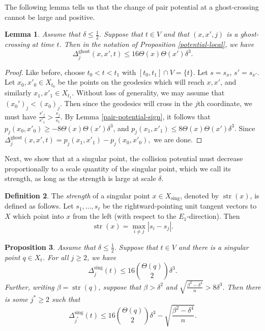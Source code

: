 \documentclass[11pt,reqno,twoside]{amsart}
\newcommand{\sing}{\mathrm{sing}}
\DeclareMathOperator{\strength}{\mathrm{str}}
\newtheorem{lemma}{Lemma}
\newtheorem{proposition}[lemma]{Proposition}
\theoremstyle{definition}
\newtheorem{definition}[lemma]{Definition}
\begin{document}
    The following lemma tells us that the change of pair potential at a ghost-crossing cannot be large and positive.

    \begin{lemma} \label{ghost-crossing-potential}
    Assume that $\delta \leq \frac{1}{2}$.
        Suppose that $t \in V$ and that $(x,x',j)$ is a ghost-crossing at time $t$. Then in the notation of Proposition \ref{potential-local}, we have
        \[\Delta_j^{\mathrm{ghost}}(x,x',t) \leq 16 \Theta(x) \Theta(x') \delta^3.\]
    \end{lemma}

    \begin{proof}
        Like before, choose $t_0 < t < t_1$ with $[t_0,t_1] \cap V = \{t\}.$ Let $s = s_x$, $s' = s_{x'}$. Let $x_0,x'_0 \in X_{t_0}$ be the points on the geodesics which will reach $x,x'$, and similarly $x_1,x'_1 \in X_{t_1}$. Without loss of generality, we may assume that $(x_0')_j < (x_0)_j$. Then since the geodesics will cross in the $j$th coordinate,
        we must have $\frac{s'_j}{s'_1}> \frac{s_j}{s_1}$. 
        By Lemma \ref{pair-potential-sign}, it follows that $p_j(x_0,x'_0) \geq -8\Theta(x)\Theta(x')\delta^3$, and $p_j(x_1,x'_1) \leq 8\Theta(x)\Theta(x')\delta^3$. Since
        $\Delta_j^{\mathrm{ghost}}(x,x',t) = p_j(x_1,x'_1)-p_j(x_0,x'_0),$
        we are done.
    \end{proof}

    Next, we show that at a singular point, the collision potential must decrease proportionally to a scale quantity of the singular point, which we call its strength, as long as the strength is large at scale $\delta$.

    \begin{definition}
        The \emph{strength} of a singular point $x \in X_\sing$, denoted by $\strength(x)$, is defined as follows. Let $s_1,\ldots,s_\ell$ be the rightward-pointing unit tangent vectors to $X$ which point into $x$ from the left (with respect to the $E_1$-direction). Then
        \[\strength(x) = \max_{i \neq j}|s_i-s_j|.\]
    \end{definition}

    
    

    \begin{proposition} \label{strength-pays-potential} Assume that $\delta \leq \frac{1}{2}.$
    Suppose that $t \in V$ and there is a singular point $q \in X_t$. 
    For all $j \geq 2$, we have
\[\Delta^\sing_{j}(t) \leq 16 {\Theta(q) \choose 2}\delta^3.\]
Further, writing $\beta = \strength(q)$,
 suppose that $\beta > \delta^2$ and
    $\sqrt{\frac{\beta^2 - \delta^4}{n}} > 8\delta^3.$
    Then there is some $j^* \geq 2$ such that
    \[\Delta^\sing_{j^*}(t) \leq 16 {\Theta(q) \choose 2}\delta^3- \sqrt{\frac{\beta^2-\delta^4}{n}}.\]
    \end{proposition}
\end{document}
